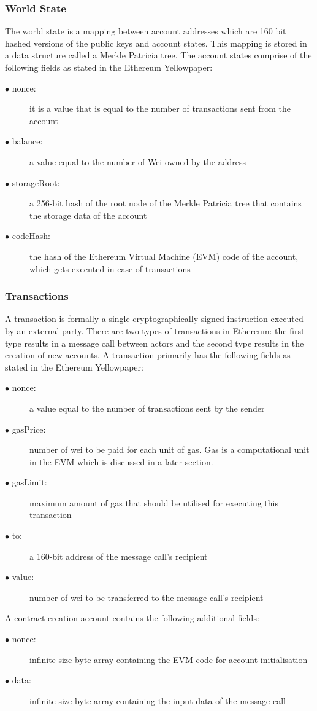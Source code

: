 \documentclass[a4paper,twoside,phd]{BYUPhys}
\begin{document}
\subsubsection{World State}
The world state is a mapping between account addresses which are 160 bit hashed versions of the public keys and account states\cite{Wood2018ETHEREUM:LEDGER}. This mapping is stored in a data structure called a Merkle Patricia tree. The account states comprise of the following fields as stated in the Ethereum Yellowpaper\cite{Wood2018ETHEREUM:LEDGER}:
\begin{description}
\item[$\bullet$ nonce:] it is a value that is equal to the number of transactions sent from the account
\item[$\bullet$ balance:] a value equal to the number of Wei owned by the address
\item[$\bullet$ storageRoot:] a 256-bit hash of the root node of the Merkle Patricia tree that contains the storage data of the account
\item[$\bullet$ codeHash:] the hash of the Ethereum Virtual Machine (EVM) code of the account, which gets executed in case of transactions
\end{description}
\subsubsection{Transactions}
A transaction is formally a single cryptographically signed instruction executed by an external party\cite{ButerinAPLATFORM}. There are two types of transactions in Ethereum: the first type results in a message call between actors and the second type results in the creation of new accounts\cite{Wood2018ETHEREUM:LEDGER}. A transaction primarily has the following fields as stated in the Ethereum Yellowpaper\cite{Wood2018ETHEREUM:LEDGER}:
\begin{description}
\item[$\bullet$ nonce:] a value equal to the number of transactions sent by the sender
\item[$\bullet$ gasPrice:] number of wei to be paid for each unit of gas. Gas is a computational unit in the EVM which is discussed in a later section.
\item[$\bullet$ gasLimit:] maximum amount of gas that should be utilised for executing this transaction
\item[$\bullet$ to:] a 160-bit address of the message call's recipient 
\item[$\bullet$ value:] number of wei to be transferred to the message call's recipient
\end{description}
A contract creation account contains the following additional fields\cite{Wood2018ETHEREUM:LEDGER}:
\begin{description}
\item[$\bullet$ nonce:] infinite size byte array containing the EVM code for account initialisation
\item[$\bullet$ data:] infinite size byte array containing the input data of the message call
\end{description}
\begin{description}
\item[]
\end{description}
\end{document}
